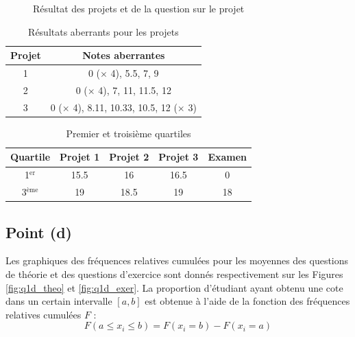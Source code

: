 \documentclass[a4paper,11pt]{article}
\begin{document}
\begin{figure}[h]
	\caption{Résultat des projets et de la question sur le projet}
	\label{fig:q1c_boxplot}
\end{figure}


\begin{table}[h]
	\center
	\begin{tabular}{|c|c|}
		\hline
		\textbf{Projet} & \textbf{Notes aberrantes}\\
		\hline
		1 & 0 ($\times$ 4), 5.5, 7, 9\\
		2 & 0 ($\times$ 4), 7, 11, 11.5, 12\\
		3 & 0 ($\times$ 4), 8.11, 10.33, 10.5, 12 ($\times$ 3)\\
		\hline
	\end{tabular}
	\caption{Résultats aberrants pour les projets}
	\label{tab:q1c_aber}
\end{table}


\begin{table}[!h]
	\center
	\begin{tabular}{|c|cccc|}
	\hline
	Quartile & \textbf{Projet 1} & \textbf{Projet 2} & \textbf{Projet 3} & \textbf{Examen} \\
	\hline
	1$^{\text{er}}$ & 15.5 & 16 & 16.5 & 0\\
	3$^{\text{ème}}$ & 19 & 18.5 & 19 & 18\\
	\hline
	\end{tabular}
	\caption{Premier et troisième quartiles}
	\label{tab:q1c_quart}
\end{table}

\subsection{Point (d)}
Les graphiques des fréquences relatives cumulées pour les moyennes des questions de théorie et des questions d'exercice sont donnés respectivement sur les Figures \ref{fig:q1d_theo} et \ref{fig:q1d_exer}. La proportion d'étudiant ayant obtenu une cote dans un certain intervalle $[a,b]$ est obtenue à l'aide de la fonction des fréquences relatives cumulées $F$ :
\[
	F(a \leq x_i \leq b) = F(x_i = b) - F(x_i = a)  
\]
\end{document}
